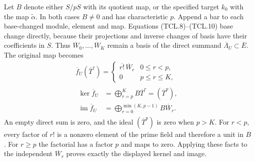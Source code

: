 Let \(B\) denote either \(S/pS\) with its quotient map, or
the specified target \(k_0\) with the map
\(\widetilde\alpha\). In both cases \(B\ne0\) and has
characteristic \(p\). Append a bar to each base-changed module,
element and map. Equations (TCL.8)--(TCL.10) base change directly,
because their projections and inverse changes of basis have their
coefficients in \(S\). Thus \(\overline W_0,\ldots,
\overline W_K\) remain a basis of the direct summand
\(\overline\Lambda_U\subset\overline E\). The original map becomes
\[
 \begin{gathered}
 \overline f_U(\overline T^r)=
 \begin{cases}
  \overline{r!}\,\overline W_r&0\leq r<p,\\
  0&p\leq r\leq K,
 \end{cases}\\
 \begin{aligned}
 \ker\overline f_U
    &=\bigoplus_{r=p}^K B\overline T^r=(\overline T^p),\\
 \operatorname{im}\overline f_U
    &=\bigoplus_{r=0}^{\min(K,p-1)}B\overline W_r.
 \end{aligned}
 \end{gathered}
 \tag{TCL.16}\label{eq:tcl-reduced-map}
\]
An empty direct sum is zero, and the ideal \((\overline T^p)\)
is zero when \(p>K\). For \(r<p\), every factor of \(r!\)
is a nonzero element of the prime field and therefore a unit in
\(B\). For \(r\geq p\) the factorial has a factor \(p\)
and maps to zero. Applying these facts to the independent
\(\overline W_r\) proves exactly the displayed kernel and image.

